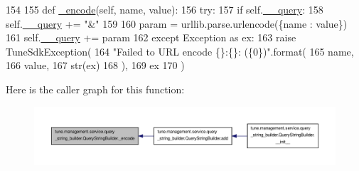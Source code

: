 \begin{DoxyCode}
154 
155     \textcolor{keyword}{def }\hyperlink{classtune_1_1management_1_1service_1_1query__string__builder_1_1QueryStringBuilder_a0b965e40a56591054bb62d0178bbe8b9}{\_encode}(self, name, value):
156         \textcolor{keywordflow}{try}:
157             \textcolor{keywordflow}{if} self.\hyperlink{classtune_1_1management_1_1service_1_1query__string__builder_1_1QueryStringBuilder_a51080f1efb7e53b5df7c2ee223f73660}{\_\_query}:
158                 self.\hyperlink{classtune_1_1management_1_1service_1_1query__string__builder_1_1QueryStringBuilder_a51080f1efb7e53b5df7c2ee223f73660}{\_\_query} += \textcolor{stringliteral}{"&"}
159 
160             param = urllib.parse.urlencode(\{name : value\})
161             self.\hyperlink{classtune_1_1management_1_1service_1_1query__string__builder_1_1QueryStringBuilder_a51080f1efb7e53b5df7c2ee223f73660}{\_\_query} += param
162         \textcolor{keywordflow}{except} Exception \textcolor{keyword}{as} ex:
163             \textcolor{keywordflow}{raise} TuneSdkException(
164                 \textcolor{stringliteral}{"Failed to URL encode \{\}:\{\}: (\{0\})"}.format(
165                     name,
166                     value,
167                     str(ex)
168                     ),
169                 ex
170             )

\end{DoxyCode}


Here is the caller graph for this function\-:
\nopagebreak
\begin{figure}[H]
\begin{center}
\leavevmode
\includegraphics[width=350pt]{classtune_1_1management_1_1service_1_1query__string__builder_1_1QueryStringBuilder_a0b965e40a56591054bb62d0178bbe8b9_icgraph}
\end{center}
\end{figure}


